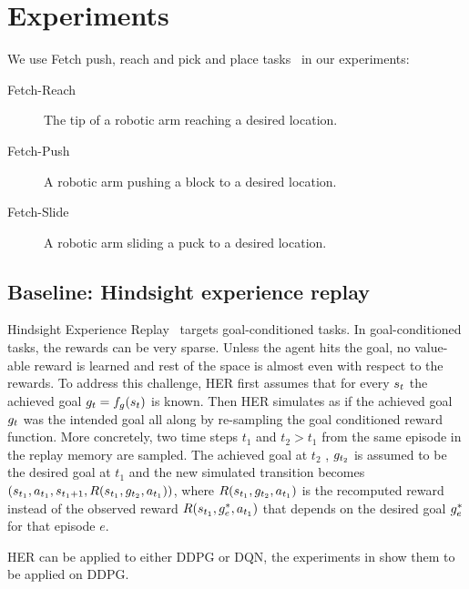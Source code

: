 
\section{Experiments}
We use Fetch push, reach and pick and place
tasks~\citep{plappert201802multigoalrl} in our experiments:
%
\begin{description}
  \item[Fetch-Reach] The tip of a robotic arm reaching a desired location.
  \item[Fetch-Push] A robotic arm pushing a block to a desired location.
  \item[Fetch-Slide] A robotic arm sliding a puck to a desired location.
\end{description}%
% 
\subsection{Baseline: Hindsight experience replay}
Hindsight Experience Replay~\cite{andrychowicz2016learning} targets
goal-conditioned tasks.
In goal-conditioned tasks, the rewards can be very sparse. Unless the agent hits
the goal, no value-able reward is learned and rest of the space is almost even
with respect to the rewards. To address this challenge, HER first assumes that
for every $s_t$ the achieved goal $g_t = f_g(s_t)$ is known.
Then HER simulates as if the achieved goal $g_t$ was the intended goal all
along by re-sampling the goal conditioned reward function.
More concretely, two time steps $t_1$ and $t_2 > t_1$ from the same episode in the replay memory are
sampled. The achieved goal at $t_2$ , $g_{t_2}$ is assumed to be the desired
goal at $t_1$ and the new simulated transition becomes $(s_{t_1},
a_{t_1}, s_{t_1 + 1}, R(s_{t_1}, g_{t_2}, a_{t_1}))$,
where $R(s_{t_1}, g_{t_2}, a_{t_1})$ is the recomputed reward
instead of the observed reward $R(s_{t_1}, g^*_{e}, a_{t_1})$ that
depends on the desired goal $g^*_{e}$ for that episode $e$.

HER can be applied to either DDPG or DQN, the experiments in
\citet{andrychowicz2016learning} show them to be applied on DDPG.



